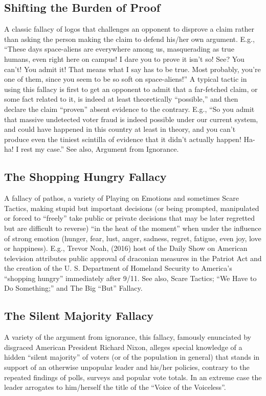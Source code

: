 \documentclass[10pt,a4paper,british]{article}
\begin{document}
\begin{multicols}{2}
    \subsection{Shifting the Burden of Proof}  A classic fallacy of logos that
    challenges an opponent to disprove a claim rather than asking the person
    making the claim to defend his/her own argument. E.g., ``These days
    space{-}aliens are everywhere among us, masquerading as true humans, even
    right here on campus! I dare you to prove it isn't so! See?  You can't! You
    admit it! That means what I say has to be true. Most probably, you're one
    of them, since you seem to be so soft on space{-}aliens!'' A typical tactic
    in using this fallacy is first to get an opponent to admit that a
    far{-}fetched claim, or some fact related to it, is indeed at least
    theoretically ``possible,'' and then declare the claim ``proven'' absent
    evidence to the contrary. E.g., ``So you admit that massive undetected
    voter fraud is indeed possible under our current system, and could have
    happened in this country at least in theory, and you can't produce even the
    tiniest scintilla of evidence that it didn't actually happen! Ha{-}ha! I
    rest my case.'' See also, Argument from Ignorance. 

    \subsection{The Shopping Hungry Fallacy} A fallacy of pathos, a variety of
    Playing on Emotions and sometimes Scare Tactics, making stupid but
    important decisions (or being prompted, manipulated or forced to ``freely''
    take public or private decisions that may be later regretted but are
    difficult to reverse) ``in the heat of the moment'' when  under the
    influence of strong emotion (hunger, fear, lust, anger, sadness, regret,
    fatigue, even joy, love or happiness). E.g., Trevor Noah, (2016) host of
    the Daily Show on American television attributes public approval of
    draconian measures in the Patriot Act and the creation of the U. S.
    Department of Homeland Security to America's ``shopping hungry'' immediately
    after 9/11. See also, Scare Tactics; ``We Have to Do Something;'' and The
    Big ``But'' Fallacy.

    \subsection{The Silent Majority Fallacy} A variety of the argument from
    ignorance, this fallacy, famously enunciated by disgraced American
    President Richard Nixon, alleges special knowledge of a hidden ``silent
    majority'' of voters (or of the population in general) that stands in
    support of an otherwise unpopular leader and his/her policies, contrary to
    the repeated findings of polls, surveys and popular vote totals. In an
    extreme case the leader arrogates to him/herself the title of the ``Voice
    of the Voiceless''.


\end{multicols}
\end{document}
